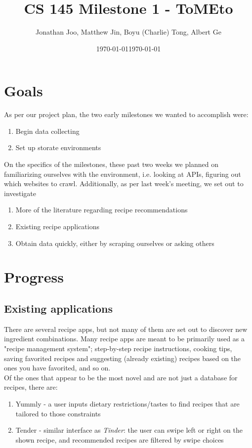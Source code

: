 \documentclass{article}
\date{\today}
\title{CS 145 Milestone 1 - ToMEto}
\author{Jonathan Joo, Matthew Jin, Boyu (Charlie) Tong, Albert Ge}
\date{\today} \\
\begin{document}
\maketitle

\section{Goals}
As per our project plan, the two early milestones we wanted to accomplish were:
\begin{enumerate}
    \item Begin data collecting
    \item Set up storate environments
\end{enumerate}

On the specifics of the milestones, these past two weeks we planned on familiarizing ourselves with the environment, i.e.
looking at APIs, figuring out which websites to crawl. Additionally, as per last week's meeting, we set out to investigate
\begin{enumerate}
    \item More of the literature regarding recipe recommendations
    \item Existing recipe applications
    \item Obtain data quickly, either by scraping ourselves or asking others
\end{enumerate}

\section{Progress}

\subsection{Existing applications}
There are several recipe apps, but not many of them are set out to
discover new ingredient combinations. Many
recipe apps are meant to be primarily used as a "recipe management
system"; step-by-step recipe instructions, cooking tips, saving
favorited recipes and suggesting (already existing) recipes
based on the ones you have favorited, and so on. \\ 
Of the ones that appear to be the most novel and are
not just a database for recipes, there are:
\begin{enumerate}
    \item Yummly - a user inputs dietary restrictions/tastes
        to find recipes that are tailored to those constraints
    \item Tender - similar interface as \textit{Tinder}:
        the user can swipe left or right on the shown recipe,
        and recommended recipes are filtered by swipe choices
\end{enumerate}
\end{document}
